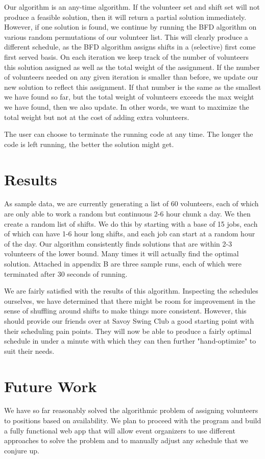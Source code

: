 \documentclass[11pt]{article}
\theoremstyle{definition}
\begin{document}
\begin{multicols}{2}
Our algorithm is an any-time algorithm.
If the volunteer set and shift set will not produce a feasible solution, then it will return a partial solution immediately.
However, if one solution is found, we continue by running the BFD algorithm on various random permutations of our volunteer list.
This will clearly produce a different schedule, as the BFD algorithm assigns shifts in a (selective) first come first served basis.
On each iteration we keep track of the number of volunteers this solution assigned as well as the total weight of the assignment.
If the number of volunteers needed on any given iteration is smaller than before, we update our new solution to reflect this assignment.
If that number is the same as the smallest we have found so far, but the total weight of volunteers exceeds the max weight we have found, then we also update.
In other words, we want to maximize the total weight but not at the cost of adding extra volunteers.

The user can choose to terminate the running code at any time.
The longer the code is left running, the better the solution might get.

\section{Results}
As sample data, we are currently generating a list of 60 volunteers, each of which are only able to work a random but continuous 2-6 hour chunk a day. We then create a random list of shifts.
We do this by starting with a base of 15 jobs, each of which can have 1-6 hour long shifts, and each job can start at a random hour of the day. Our algorithm consistently finds solutions that are
within 2-3 volunteers of the lower bound. Many times it will actually find the optimal solution. Attached in appendix B are three sample runs, each of which were terminated after 30 seconds of running.

We are fairly satisfied with the results of this algorithm. Inspecting the schedules ourselves, we have determined that there might be room for improvement in the sense of shuffling around shifts to make things more consistent.
However, this should provide our friends over at Savoy Swing Club a good starting point with their scheduling pain points.
They will now be able to produce a fairly optimal schedule in under a minute with which they can then further "hand-optimize" to suit their needs.

\section{Future Work}
We have so far reasonably solved the algorithmic problem of assigning volunteers to positions based on availability.
We plan to proceed with the program and build a fully functional web app that will allow event organizers to use different approaches to solve the problem and to manually adjust any schedule that we conjure up.


\end{multicols}
\end{document}
